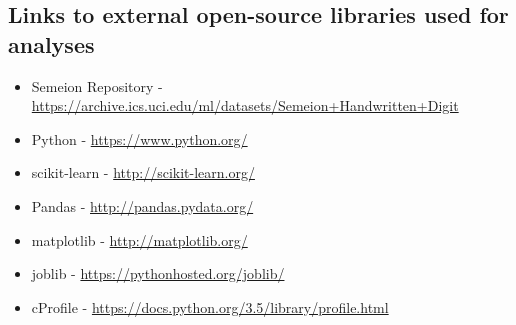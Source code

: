 \documentclass[letterpaper,10pt]{article}
\theoremstyle{mytheor}
\begin{document}
\subsection{Links to external open-source libraries used for analyses}
\begin{itemize}
\item Semeion Repository - \url{https://archive.ics.uci.edu/ml/datasets/Semeion+Handwritten+Digit}
\item Python - \url{https://www.python.org/}
\item scikit-learn - \url{http://scikit-learn.org/}
\item Pandas - \url{http://pandas.pydata.org/}
\item matplotlib - \url{http://matplotlib.org/}
\item joblib - \url{https://pythonhosted.org/joblib/}
\item cProfile - \url{https://docs.python.org/3.5/library/profile.html}
\end{itemize}
\end{document}
